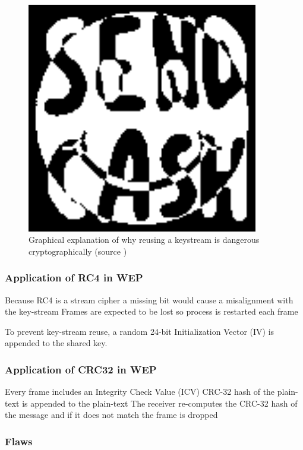 \documentclass[pdftex, 12pt, a4paper]{article}
\begin{document}
\begin{figure}[htb]
    \centering
    \includegraphics[width=0.9\textwidth ]{img/smicash1}
    \caption{Graphical explanation of why reusing a keystream is dangerous cryptographically (source \protect\cite{stream-reuse})}
    \label{fig:xor}
\end{figure}

\subsubsection{Application of RC4 in WEP}
Because RC4 is a stream cipher a missing bit would cause a misalignment with the key-stream
Frames are expected to be lost so process is restarted each frame

To prevent key-stream reuse, a random 24-bit Initialization Vector (IV) is appended to the shared key.

\subsubsection{Application of CRC32 in WEP}
Every frame includes an Integrity Check Value (ICV)
CRC-32 hash of the plain-text is appended to the plain-text
The receiver re-computes the CRC-32 hash of the message and if it does not match the frame is dropped

\subsubsection{Flaws}
\end{document}
